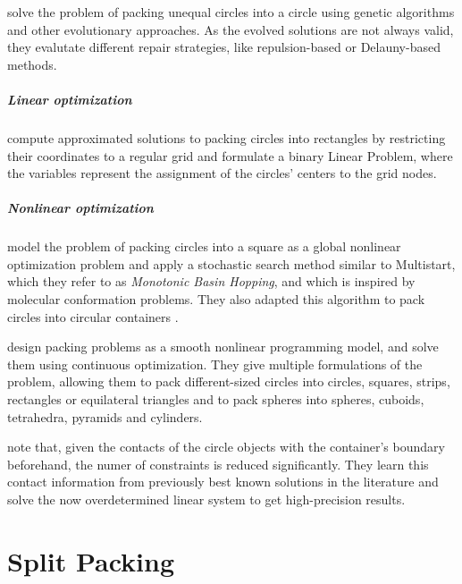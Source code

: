 \documentclass[a4paper,style=print,oneside,bibliography=totoc,nexus,lnum,extramargin]{tubsbook}
\begin{document}
\textcite{FMC2015evolutionary} solve the problem of packing unequal circles into a circle using genetic algorithms and other evolutionary approaches. As the evolved solutions are not always valid, they evalutate different repair strategies, like repulsion-based or Delauny-based methods.

\paragraph{Linear optimization}

\textcite{LIE2014approximate} compute approximated solutions to packing circles into rectangles by restricting their coordinates to a regular grid and formulate a binary Linear Problem, where the variables represent the assignment of the circles' centers to the grid nodes.


\paragraph{Nonlinear optimization}

\textcite{ALS2008disk} model the problem of packing circles into a square as a global nonlinear optimization problem and apply a stochastic search method similar to Multistart, which they refer to as \emph{Monotonic Basin Hopping}, and which is inspired by molecular conformation problems. They also adapted this algorithm to pack circles into circular containers \cite{GJLS2009solving}.

\textcite{BS2008minimizing} design packing problems as a smooth nonlinear programming model, and solve them using continuous optimization. They give multiple formulations of the problem, allowing them to pack different-sized circles into circles, squares, strips, rectangles or equilateral triangles and to pack spheres into spheres, cuboids, tetrahedra, pyramids and cylinders.

\textcite{BG2010new} note that, given the contacts of the circle objects with the container's boundary beforehand, the numer of constraints is reduced significantly. They learn this contact information from previously best known solutions in the literature and solve the now overdetermined linear system to get high-precision results.

\chapter{Split Packing}\label{ch:split-packing}
\end{document}
